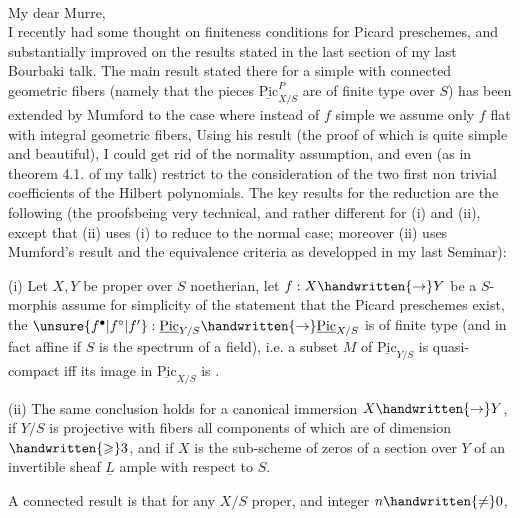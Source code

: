 \\

My dear Murre,\\

I recently had some thought on finiteness conditions for Picard preschemes, and substantially improved on the results stated in the last section of my last Bourbaki talk. The main result stated there for a simple  with connected geometric fibers (namely that the pieces $\underline{\mathrm{Pic}}^{P}_{X/S}$ are of finite type over $S$) has been extended by Mumford to the case where  instead of $f$ simple we assume only $f$ flat with integral geometric fibers, Using his result (the proof of which is quite simple and beautiful), I could get rid of the normality assumption, and even (as in theorem 4.1. of my talk) restrict to the consideration of the two first non trivial coefficients of the Hilbert polynomials. The key results for the reduction are the following (the proofsbeing very technical, and rather different for (i) and (ii), except that (ii) uses (i) to reduce to the normal case; moreover (ii) uses Mumford's result and the equivalence criteria as developped in my last Seminar):

(i) Let $X,Y$ be proper over $S$ noetherian, let $f:X\handwritten{\to}Y$ be a  $S$-morphis  assume for simplicity of the statement that the Picard preschemes exist, the $\unsure{f^{\bullet}|f^{\circ}|f'}:\underline{\mathrm{Pic}}_{Y/S}\handwritten{\to}\underline{\mathrm{Pic}}_{X/S}$ is of finite type (and in fact affine if $S$ is the spectrum of a field), i.e. a subset $M$ of $\underline{\mathrm{Pic}}_{Y/S}$ is quasi-compact iff its image in $\underline{\mathrm{Pic}}_{X/S}$ is .

(ii) The same conclusion holds for a canonical immersion $X\handwritten{\to}Y$, if $Y/S$ is projective with fibers all components of which are of dimension $\handwritten{\geqslant}3$, and if $X$ is the sub-scheme of zeros of a section over $Y$ of an invertible sheaf $\underline{L}$ ample with respect to $S$.

A connected result is that for any $X/S$ proper, and integer $n\handwritten{\ne}0$,
